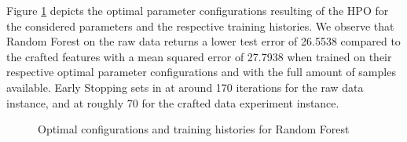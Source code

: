 Figure \ref{fig:RF_Optimal} depicts the optimal parameter configurations resulting of the HPO for the considered parameters and the respective training histories. We observe that Random Forest on the raw data returns a lower test error of 26.5538 compared to the crafted features with a mean squared error of 27.7938 when trained on their respective optimal parameter configurations and with the full amount of samples available. Early Stopping sets in at around 170 iterations for the raw data instance, and at roughly 70 for the crafted data experiment instance. 
\begin{figure}[h]
	\centering
	\caption{Optimal configurations and training histories for Random Forest}
	\label{fig:RF_Optimal}
\end{figure}


